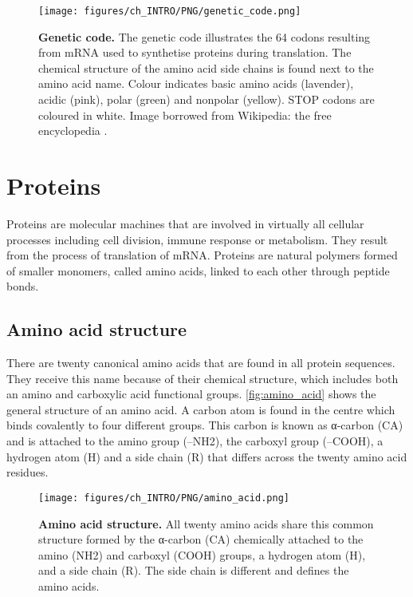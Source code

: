 \begin{figure}[htb!]
    \centering
    \texttt{[image: figures/ch\_INTRO/PNG/genetic\_code.png]}
    \caption[Genetic code]{\textbf{Genetic code.} The genetic code illustrates the 64 codons resulting from mRNA used to synthetise proteins during translation. The chemical structure of the amino acid side chains is found next to the amino acid name. Colour indicates basic amino acids (lavender), acidic (pink), polar (green) and nonpolar (yellow). STOP codons are coloured in white. Image borrowed from Wikipedia: the free encyclopedia \cite{genetic_code_image}.}
    \label{fig:genetic_code}
\end{figure}

\section{Proteins}

Proteins are molecular machines that are involved in virtually all cellular processes including cell division, immune response or metabolism. They result from the process of translation of mRNA. Proteins are natural polymers formed of smaller monomers, called amino acids, linked to each other through peptide bonds.

\subsection{Amino acid structure}

There are twenty canonical amino acids that are found in all protein sequences. They receive this name because of their chemical structure, which includes both an amino and carboxylic acid functional groups. \autoref{fig:amino_acid} shows the general structure of an amino acid. A carbon atom is found in the centre which binds covalently to four different groups. This carbon is known as α-carbon (CA) and is attached to the amino group (--NH2), the carboxyl group (--COOH), a hydrogen atom (H) and a side chain (R) that differs across the twenty amino acid residues.

\begin{figure}[htbp!]
    \centering
    \texttt{[image: figures/ch\_INTRO/PNG/amino\_acid.png]}
    \caption[Amino acid structure]{\textbf{Amino acid structure.} All twenty amino acids share this common structure formed by the α-carbon (CA) chemically attached to the amino (NH2) and carboxyl (COOH) groups, a hydrogen atom (H), and a side chain (R). The side chain is different and defines the amino acids.}
    \label{fig:amino_acid}
\end{figure}

